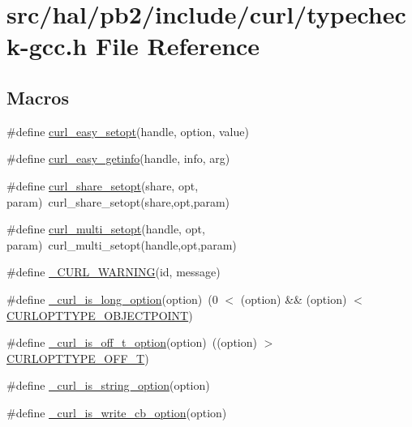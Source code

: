 \hypertarget{typecheck-gcc_8h}{}\section{src/hal/pb2/include/curl/typecheck-\/gcc.h File Reference}
\label{typecheck-gcc_8h}
\subsection*{Macros}
\begin{DoxyCompactItemize}
\item 
\#define \hyperlink{typecheck-gcc_8h_af8d527555aeac344caa3754445c6ecba}{curl\+\_\+easy\+\_\+setopt}(handle,  option,  value)
\item 
\#define \hyperlink{typecheck-gcc_8h_a978f4e7a75943f3c2a518eb72da213f2}{curl\+\_\+easy\+\_\+getinfo}(handle,  info,  arg)
\item 
\#define \hyperlink{typecheck-gcc_8h_a3770cd3713e7cd0f49af3c076d58805a}{curl\+\_\+share\+\_\+setopt}(share,  opt,  param)~curl\+\_\+share\+\_\+setopt(share,opt,param)
\item 
\#define \hyperlink{typecheck-gcc_8h_afc081c3dd70db2f2641dd96d2513d8d3}{curl\+\_\+multi\+\_\+setopt}(handle,  opt,  param)~curl\+\_\+multi\+\_\+setopt(handle,opt,param)
\item 
\#define \hyperlink{typecheck-gcc_8h_adf5788b674ae99d7ee08c5fefa675609}{\+\_\+\+C\+U\+R\+L\+\_\+\+W\+A\+R\+N\+I\+NG}(id,  message)
\item 
\#define \hyperlink{typecheck-gcc_8h_ad0023d3e06ec2f748431e094e6f6aa10}{\+\_\+curl\+\_\+is\+\_\+long\+\_\+option}(option)~(0 $<$ (option) \&\& (option) $<$ \hyperlink{curl_8h_a88edcf8f9aaf67683b27caca050e87b6}{C\+U\+R\+L\+O\+P\+T\+T\+Y\+P\+E\+\_\+\+O\+B\+J\+E\+C\+T\+P\+O\+I\+NT})
\item 
\#define \hyperlink{typecheck-gcc_8h_a0452c43ac04346025736e5082cbd8e14}{\+\_\+curl\+\_\+is\+\_\+off\+\_\+t\+\_\+option}(option)~((option) $>$ \hyperlink{curl_8h_ac8bad04621a0523755477f782b7a656a}{C\+U\+R\+L\+O\+P\+T\+T\+Y\+P\+E\+\_\+\+O\+F\+F\+\_\+T})
\item 
\#define \hyperlink{typecheck-gcc_8h_a4d77b565e583b9e9e25dc7473a62c558}{\+\_\+curl\+\_\+is\+\_\+string\+\_\+option}(option)
\item 
\#define \hyperlink{typecheck-gcc_8h_afa2b47b2fb3f3cb1b30f1459e3e83dba}{\+\_\+curl\+\_\+is\+\_\+write\+\_\+cb\+\_\+option}(option)
\item 

\end{DoxyCompactItemize}
